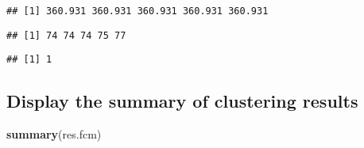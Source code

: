 \documentclass[
]{elegantbook}
\newenvironment{Shaded}{\begin{snugshade}}{\end{snugshade}}
\newcommand{\FunctionTok}[1]{\textcolor[rgb]{0.13,0.29,0.53}{\textbf{#1}}}
\newcommand{\NormalTok}[1]{#1}
\newcommand{\SpecialCharTok}[1]{\textcolor[rgb]{0.81,0.36,0.00}{\textbf{#1}}}
\begin{document}
\begin{verbatim}
## [1] 360.931 360.931 360.931 360.931 360.931
\end{verbatim}

\begin{Shaded}
\end{Shaded}

\begin{verbatim}
## [1] 74 74 74 75 77
\end{verbatim}

\begin{Shaded}
\end{Shaded}

\begin{verbatim}
## [1] 1
\end{verbatim}

\hypertarget{display-the-summary-of-clustering-results}{%
\subsection{Display the summary of clustering results}\label{display-the-summary-of-clustering-results}}

\begin{Shaded}
\begin{Highlighting}[]
\FunctionTok{summary}\NormalTok{(res.fcm)}
\end{Highlighting}
\end{Shaded}
\end{document}
